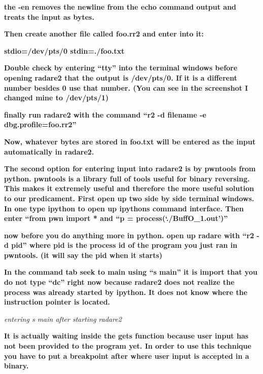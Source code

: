 \documentclass[letterpaper]{article}
\newcommand{\sitfig}[3]{
\begin{figure}[H]
\centering
\makebox[\textwidth][c]{
#2
}
\label{#1}
\end{figure}
}
\newcommand{\sitgfx}[4][scale=1.0]{
\sitfig{#3}{\texttt{[image: \#2]}}{#4}
}
\begin{document}
\textbf{the -en removes the newline from the echo command output and treats the input as bytes.}

\textbf{Then create another file called foo.rr2 and enter into it:}

\textbf{stdio=/dev/pts/0\newline
stdin=./foo.txt}

\textbf{Double check by entering ``tty'' into the terminal windows before opening radare2 that the output is /dev/pts/0.
If it is a different number besides 0 use that number. (You can see in the screenshot I changed mine to /dev/pts/1)}

\textbf{finally run radare2 with the command ``r2 -d filename -e dbg.profile=foo.rr2''}

\textbf{Now, whatever bytes are stored in foo.txt will be entered as the input automatically in radare2.}

  
\sitgfx[width=5.8335in,height=3.6457in]{reversing-img097.png}{fig:unk}{TODO CAPTION}
 \textbf{ }

\textbf{The second option for entering input into radare2 is by pwntools from python. pwntools is a library full of
tools useful for binary reversing. This makes it extremely useful and therefore the more useful solution to our
predicament.\newline
First open up two side by side terminal windows. In one type ipython to open up ipythons command interface. Then enter
``from pwn import *{\textquotedbl} and ``p = process(`./BuffO\_1.out')''}

  
\sitgfx[width=5.8335in,height=3.6457in]{reversing-img098.png}{fig:unk}{TODO CAPTION}
 

\textbf{now before you do anything more in python. open up radare with ``r2 -d pid'' where pid is the process id of the
program you just ran in pwntools. (it will say the pid when it starts)}

  
\sitgfx[width=5.8335in,height=3.6457in]{reversing-img099.png}{fig:unk}{TODO CAPTION}
 

\textbf{In the command tab seek to main using ``s main'' it is import that you do not type ``dc'' right now because
radare2 does not realize the process was already started by ipython. It does not know where the instruction pointer is
located.}

  
\sitgfx[width=5.8335in,height=3.6457in]{reversing-img100.png}{fig:unk}{TODO CAPTION}
 

\textit{entering s main after starting radare2}

\textbf{It is actually waiting inside the gets function because user input has not been provided to the program yet. In
order to use this technique you have to put a breakpoint after where user input is accepted in a binary.}
\end{document}
